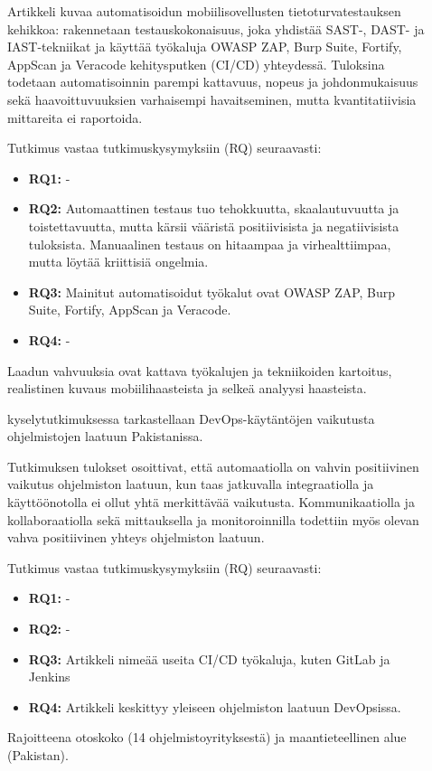 \documentclass[bscthesis,finnish,oneside,biblatex]{uefcsthesis}
\begin{document}
    \begin{description}
        \item[\cite{nutalapati2023_tools_techniques}] Artikkeli kuvaa automatisoidun mobiilisovellusten tietoturvatestauksen kehikkoa: rakennetaan testauskokonaisuus, joka yhdistää SAST-, DAST- ja IAST-tekniikat ja käyttää työkaluja OWASP ZAP, Burp Suite, Fortify, AppScan ja Veracode kehitysputken (CI/CD) yhteydessä. Tuloksina todetaan automatisoinnin parempi kattavuus, nopeus ja johdonmukaisuus sekä haavoittuvuuksien varhaisempi havaitseminen, mutta kvantitatiivisia mittareita ei raportoida.

        Tutkimus vastaa tutkimuskysymyksiin (RQ) seuraavasti:
        \begin{itemize}
            \item \textbf{RQ1:} -
            \item \textbf{RQ2:} Automaattinen testaus tuo tehokkuutta, skaalautuvuutta ja toistettavuutta, mutta kärsii vääristä positiivisista ja negatiivisista tuloksista. Manuaalinen testaus on hitaampaa ja virhealttiimpaa, mutta löytää kriittisiä ongelmia.
            \item \textbf{RQ3:} Mainitut automatisoidut työkalut ovat OWASP ZAP, Burp Suite, Fortify, AppScan ja Veracode.
            \item \textbf{RQ4:} -
        \end{itemize}

        Laadun vahvuuksia ovat kattava työkalujen ja tekniikoiden kartoitus, realistinen kuvaus mobiilihaasteista ja selkeä analyysi haasteista.
    \end{description}

    \begin{description}
        \item[\cite{saleem2023_survey}] kyselytutkimuksessa tarkastellaan DevOps-käytäntöjen vaikutusta ohjelmistojen laatuun Pakistanissa.

        Tutkimuksen tulokset osoittivat, että automaatiolla on vahvin positiivinen vaikutus ohjelmiston laatuun, kun taas jatkuvalla integraatiolla ja käyttöönotolla ei ollut yhtä merkittävää vaikutusta. Kommunikaatiolla ja kollaboraatiolla sekä mittauksella ja monitoroinnilla todettiin myös olevan vahva positiivinen yhteys ohjelmiston laatuun.

        Tutkimus vastaa tutkimuskysymyksiin (RQ) seuraavasti:
        \begin{itemize}
            \item \textbf{RQ1:} -
            \item \textbf{RQ2:} -
            \item \textbf{RQ3:} Artikkeli nimeää useita CI/CD työkaluja, kuten GitLab ja Jenkins
            \item \textbf{RQ4:} Artikkeli keskittyy yleiseen ohjelmiston laatuun DevOpsissa.
        \end{itemize}

        Rajoitteena otoskoko (14 ohjelmistoyrityksestä) ja maantieteellinen alue (Pakistan).
    \end{description}
\end{document}
